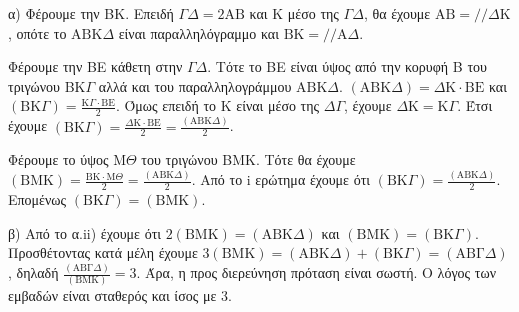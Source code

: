 α) Φέρουμε την ΒΚ. Επειδή $\Gamma\Delta = 2\text{ΑΒ}$ και Κ μέσο της $\Gamma\Delta$, θα έχουμε $\text{ΑΒ} = //\Delta\text{Κ}$, οπότε το $\text{ΑΒΚ}\Delta$ είναι παραλληλόγραμμο και $\text{ΒΚ}=//\text{Α}\Delta$.
\begin{rlist}
    \item Φέρουμε την ΒΕ κάθετη στην $\Gamma\Delta$. Τότε το ΒΕ είναι ύψος από την κορυφή Β του τριγώνου ΒΚ$\Gamma$ αλλά και του παραλληλογράμμου $\text{ΑΒΚ}\Delta$. $(\text{ΑΒΚ}\Delta) = \Delta\text{Κ} \cdot \text{ΒΕ}$ και $(\text{ΒΚ}\Gamma) = \frac{\text{Κ}\Gamma \cdot \text{ΒΕ}}{2}$.
    Όμως επειδή το Κ είναι μέσο της $\Delta\Gamma$, έχουμε $\Delta\text{Κ} = \text{Κ}\Gamma$.
    Έτσι έχουμε $(\text{ΒΚ}\Gamma) = \frac{\Delta\text{Κ} \cdot \text{ΒΕ}}{2} = \frac{(\text{ΑΒΚ}\Delta)}{2}$.
    \item Φέρουμε το ύψος Μ$\Theta$ του τριγώνου ΒΜΚ.
    Τότε θα έχουμε $(\text{ΒΜΚ}) = \frac{\text{ΒΚ} \cdot \text{Μ}\Theta}{2} = \frac{(\text{ΑΒΚ}\Delta)}{2}$. Από το i ερώτημα έχουμε ότι $(\text{ΒΚ}\Gamma) = \frac{(\text{ΑΒΚ}\Delta)}{2}$. Επομένως $(\text{ΒΚ}\Gamma) = (\text{ΒΜΚ})$.
\end{rlist}
β) Από το α.ii) έχουμε ότι $2(\text{ΒΜΚ}) = (\text{ΑΒΚ}\Delta)$ και $(\text{ΒΜΚ}) = (\text{ΒΚ}\Gamma)$.
Προσθέτοντας κατά μέλη έχουμε $3(\text{ΒΜΚ})=(\text{ΑΒΚ}\Delta) + (\text{ΒΚ}\Gamma) = (\text{ΑΒΓ}\Delta)$,
δηλαδή $\frac{(\text{ΑΒΓ}\Delta)}{(\text{ΒΜΚ})} = 3$.
Άρα, η προς διερεύνηση πρόταση είναι σωστή. Ο λόγος των εμβαδών είναι σταθερός και ίσος με 3.